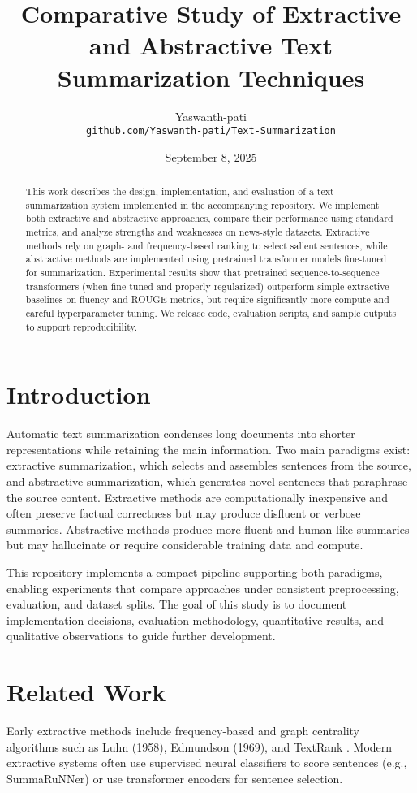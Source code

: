 \documentclass[11pt,a4paper]{article}
\title{Comparative Study of Extractive and Abstractive Text Summarization Techniques}
\author{Yaswanth-pati\\ \texttt{github.com/Yaswanth-pati/Text-Summarization}}
\date{September 8, 2025}
\begin{document}
\maketitle

\begin{abstract}
This work describes the design, implementation, and evaluation of a text summarization system implemented in the accompanying repository. We implement both extractive and abstractive approaches, compare their performance using standard metrics, and analyze strengths and weaknesses on news-style datasets. Extractive methods rely on graph- and frequency-based ranking to select salient sentences, while abstractive methods are implemented using pretrained transformer models fine-tuned for summarization. Experimental results show that pretrained sequence-to-sequence transformers (when fine-tuned and properly regularized) outperform simple extractive baselines on fluency and ROUGE metrics, but require significantly more compute and careful hyperparameter tuning. We release code, evaluation scripts, and sample outputs to support reproducibility.
\end{abstract}

\section{Introduction}
Automatic text summarization condenses long documents into shorter representations while retaining the main information. Two main paradigms exist: extractive summarization, which selects and assembles sentences from the source, and abstractive summarization, which generates novel sentences that paraphrase the source content. Extractive methods are computationally inexpensive and often preserve factual correctness but may produce disfluent or verbose summaries. Abstractive methods produce more fluent and human-like summaries but may hallucinate or require considerable training data and compute.

This repository implements a compact pipeline supporting both paradigms, enabling experiments that compare approaches under consistent preprocessing, evaluation, and dataset splits. The goal of this study is to document implementation decisions, evaluation methodology, quantitative results, and qualitative observations to guide further development.

\section{Related Work}
Early extractive methods include frequency-based and graph centrality algorithms such as Luhn (1958), Edmundson (1969), and TextRank \cite{mihalcea2004textrank}. Modern extractive systems often use supervised neural classifiers to score sentences (e.g., SummaRuNNer) or use transformer encoders for sentence selection.
\end{document}
